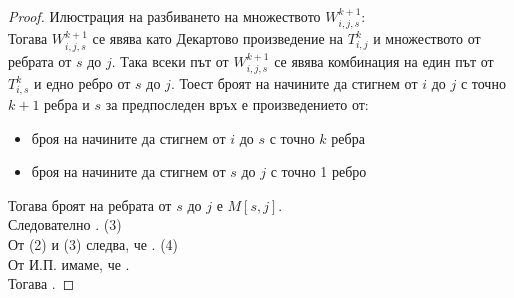 \begin{proof}
    Илюстрация на разбиването на множеството \(W_{i, j, s}^{k + 1}\): \\
    Тогава \(W_{i, j, s}^{k + 1}\) се явява като Декартово произведение на \(T_{i, j}^{k}\) и множеството 
    от ребрата от \(s\) до \(j\). Така всеки път от \(W_{i, j, s}^{k + 1}\) се явява комбинация на един път 
    от \(T_{i, s}^{k}\) и едно ребро от \(s\) до \(j\). Тоест броят на начините да стигнем от \(i\) до \(j\) 
    с точно \(k + 1\) ребра и \(s\) за предпоследен връх е произведението от:
    \begin{itemize}
        \item броя на начините да стигнем от \(i\) до \(s\) с точно \(k\) ребра
        \item броя на начините да стигнем от \(s\) до \(j\) с точно 1 ребро
    \end{itemize}
    Тогава броят на ребрата от \(s\) до \(j\) е \(M[s, j]\). \\
    Следователно . (3) \\
    От (2) и (3) следва, че . (4) \\
    От И.П. имаме, че . \\
    Тогава .
\end{proof}